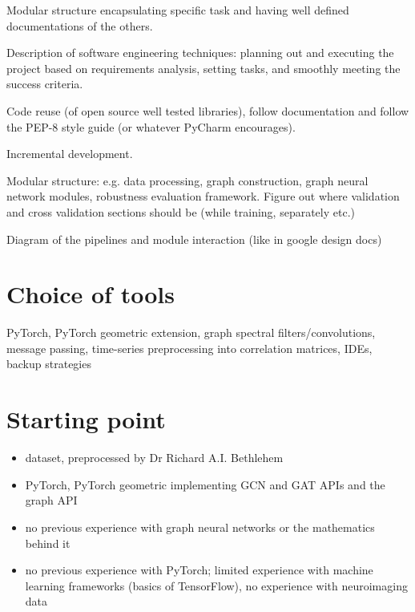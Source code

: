 Modular structure encapsulating specific task and having well defined documentations of the others.

Description of software engineering techniques: planning out and executing the project based on requirements analysis, setting tasks, and smoothly meeting the success criteria.

Code reuse (of open source well tested libraries), follow documentation and follow the PEP-8 style guide (or whatever PyCharm encourages).

Incremental development.

Modular structure: e.g. data processing, graph construction, graph neural network modules, robustness evaluation framework. Figure out where validation and cross validation sections should be (while training, separately etc.)

Diagram of the pipelines and module interaction (like in google design docs)


\section{Choice of tools}
PyTorch, PyTorch geometric extension, graph spectral filters/convolutions, message passing, time-series preprocessing into correlation matrices, IDEs, backup strategies

\section{Starting point}
\begin{itemize}
    \item dataset, preprocessed by Dr Richard A.I. Bethlehem
    \item PyTorch, PyTorch geometric implementing GCN and GAT APIs and the graph API
    \item no previous experience with graph neural networks or the mathematics behind it
    \item no previous experience with PyTorch; limited experience with machine learning frameworks (basics of TensorFlow), no experience with neuroimaging data
\end{itemize}
